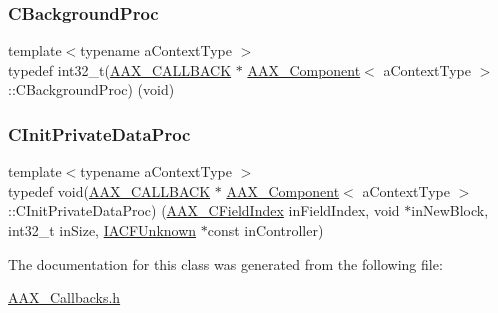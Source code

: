 \mbox{\label{a01437_a69fa55fbcbe19518395a0bf73bd12591}} 
\subsubsection{\texorpdfstring{CBackgroundProc}{CBackgroundProc}}
{\footnotesize\ttfamily template$<$typename a\+Context\+Type $>$ \\
typedef int32\+\_\+t(\mbox{\hyperlink{a00392_aaa22112139aa627574b1ef562f579d43}{A\+A\+X\+\_\+\+C\+A\+L\+L\+B\+A\+CK}} $\ast$ \mbox{\hyperlink{a01437}{A\+A\+X\+\_\+\+Component}}$<$ a\+Context\+Type $>$\+::C\+Background\+Proc) (void)}

\mbox{\label{a01437_a44affb8e2f47718b198bdf47f49ff2b1}} 
\subsubsection{\texorpdfstring{CInitPrivateDataProc}{CInitPrivateDataProc}}
{\footnotesize\ttfamily template$<$typename a\+Context\+Type $>$ \\
typedef void(\mbox{\hyperlink{a00392_aaa22112139aa627574b1ef562f579d43}{A\+A\+X\+\_\+\+C\+A\+L\+L\+B\+A\+CK}} $\ast$ \mbox{\hyperlink{a01437}{A\+A\+X\+\_\+\+Component}}$<$ a\+Context\+Type $>$\+::C\+Init\+Private\+Data\+Proc) (\mbox{\hyperlink{a00392_ae807f8986143820cfb5d6da32165c9c7}{A\+A\+X\+\_\+\+C\+Field\+Index}} in\+Field\+Index, void $\ast$in\+New\+Block, int32\+\_\+t in\+Size, \mbox{\hyperlink{a01409}{I\+A\+C\+F\+Unknown}} $\ast$const in\+Controller)}



The documentation for this class was generated from the following file\+:\begin{DoxyCompactItemize}
\item 
\mbox{\hyperlink{a00401}{A\+A\+X\+\_\+\+Callbacks.\+h}}\end{DoxyCompactItemize}
